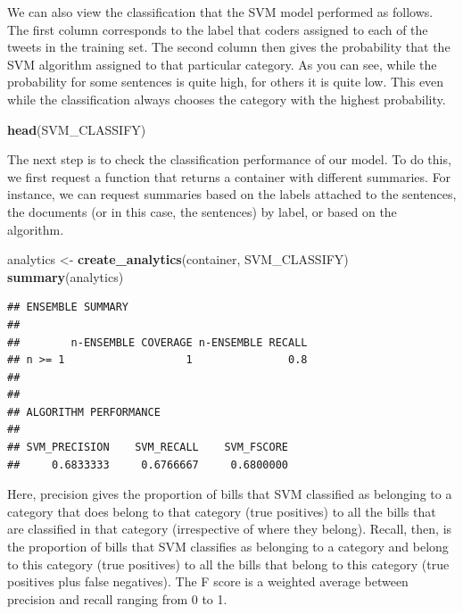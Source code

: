 \documentclass[
]{book}
\newenvironment{Shaded}{\begin{snugshade}}{\end{snugshade}}
\newcommand{\FunctionTok}[1]{\textcolor[rgb]{0.13,0.29,0.53}{\textbf{#1}}}
\newcommand{\NormalTok}[1]{#1}
\newcommand{\OtherTok}[1]{\textcolor[rgb]{0.56,0.35,0.01}{#1}}
\begin{document}
We can also view the classification that the SVM model performed as follows. The first column corresponds to the label that coders assigned to each of the tweets in the training set. The second column then gives the probability that the SVM algorithm assigned to that particular category. As you can see, while the probability for some sentences is quite high, for others it is quite low. This even while the classification always chooses the category with the highest probability.

\begin{Shaded}
\begin{Highlighting}[]
\FunctionTok{head}\NormalTok{(SVM\_CLASSIFY)}
\end{Highlighting}
\end{Shaded}

The next step is to check the classification performance of our model. To do this, we first request a function that returns a container with different summaries. For instance, we can request summaries based on the labels attached to the sentences, the documents (or in this case, the sentences) by label, or based on the algorithm.

\begin{Shaded}
\begin{Highlighting}[]
\NormalTok{analytics }\OtherTok{\textless{}{-}} \FunctionTok{create\_analytics}\NormalTok{(container, SVM\_CLASSIFY)}
\FunctionTok{summary}\NormalTok{(analytics)}
\end{Highlighting}
\end{Shaded}

\begin{verbatim}
## ENSEMBLE SUMMARY
## 
##        n-ENSEMBLE COVERAGE n-ENSEMBLE RECALL
## n >= 1                   1               0.8
## 
## 
## ALGORITHM PERFORMANCE
## 
## SVM_PRECISION    SVM_RECALL    SVM_FSCORE 
##     0.6833333     0.6766667     0.6800000
\end{verbatim}

Here, precision gives the proportion of bills that SVM classified as belonging to a category that does belong to that category (true positives) to all the bills that are classified in that category (irrespective of where they belong). Recall, then, is the proportion of bills that SVM classifies as belonging to a category and belong to this category (true positives) to all the bills that belong to this category (true positives plus false negatives). The F score is a weighted average between precision and recall ranging from 0 to 1.
\end{document}
